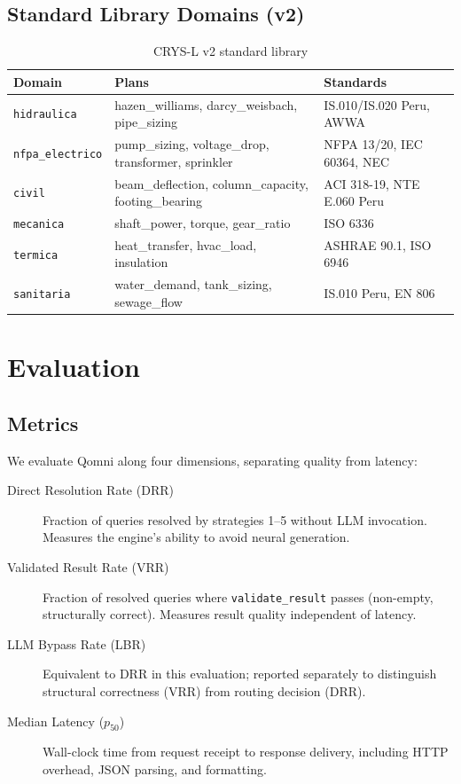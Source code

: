 \documentclass[12pt,a4paper]{article}
\begin{document}
\subsection{Standard Library Domains (v2)}

\begin{table}[h]
\centering
\caption{CRYS-L v2 standard library}
\begin{tabular}{lll}
\toprule
Domain & Plans & Standards \\
\midrule
\texttt{hidraulica} & hazen\_williams, darcy\_weisbach, pipe\_sizing & IS.010/IS.020 Peru, AWWA \\
\texttt{nfpa\_electrico} & pump\_sizing, voltage\_drop, transformer, sprinkler & NFPA 13/20, IEC 60364, NEC \\
\texttt{civil} & beam\_deflection, column\_capacity, footing\_bearing & ACI 318-19, NTE E.060 Peru \\
\texttt{mecanica} & shaft\_power, torque, gear\_ratio & ISO 6336 \\
\texttt{termica} & heat\_transfer, hvac\_load, insulation & ASHRAE 90.1, ISO 6946 \\
\texttt{sanitaria} & water\_demand, tank\_sizing, sewage\_flow & IS.010 Peru, EN 806 \\
\bottomrule
\end{tabular}
\end{table}

\section{Evaluation}
\label{sec:eval}

\subsection{Metrics}
\label{sec:metrics}

We evaluate Qomni along four dimensions, separating quality from latency:

\begin{description}
  \item[Direct Resolution Rate (DRR)] Fraction of queries resolved by strategies
    1--5 without LLM invocation. Measures the engine's ability to avoid
    neural generation.
  \item[Validated Result Rate (VRR)] Fraction of resolved queries where
    \texttt{validate\_result} passes (non-empty, structurally correct).
    Measures result quality independent of latency.
  \item[LLM Bypass Rate (LBR)] Equivalent to DRR in this evaluation;
    reported separately to distinguish structural correctness (VRR) from
    routing decision (DRR).
  \item[Median Latency ($p_{50}$)] Wall-clock time from request receipt
    to response delivery, including HTTP overhead, JSON parsing, and formatting.
\end{description}
\end{document}
